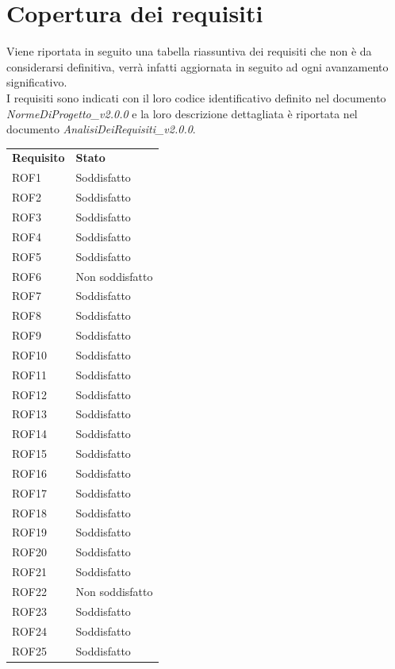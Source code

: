 \newpage
\section{Copertura dei requisiti}
Viene riportata in seguito una tabella riassuntiva dei requisiti che non è da considerarsi definitiva, verrà infatti aggiornata in seguito ad ogni avanzamento significativo. \\
I requisiti sono indicati con il loro codice identificativo definito nel documento \textit{NormeDiProgetto\_v2.0.0} e la loro descrizione dettagliata è riportata nel documento \textit{AnalisiDeiRequisiti\_v2.0.0}.
\begin{longtable}{| p{2.5cm} | p{3cm} |}
	\rowcolor{LightBlue}
	\color{white}\bfseries Requisito & \color{white}\bfseries Stato \\
	ROF1 & Soddisfatto \\ \hline
	ROF2 & Soddisfatto \\ \hline
	ROF3 & Soddisfatto \\ \hline
	ROF4 & Soddisfatto \\ \hline
	ROF5 & Soddisfatto \\ \hline
	ROF6 & Non soddisfatto \\ \hline
	ROF7 & Soddisfatto \\ \hline
	ROF8 & Soddisfatto \\ \hline
	ROF9 & Soddisfatto \\ \hline
	ROF10 & Soddisfatto \\ \hline
	ROF11 & Soddisfatto \\ \hline
	ROF12 & Soddisfatto \\ \hline
	ROF13 & Soddisfatto \\ \hline
	ROF14 & Soddisfatto \\ \hline
	ROF15 & Soddisfatto \\ \hline
	ROF16 & Soddisfatto \\ \hline
	ROF17 & Soddisfatto \\ \hline
	ROF18 & Soddisfatto \\ \hline
	ROF19 & Soddisfatto \\ \hline
	ROF20 & Soddisfatto \\ \hline
	ROF21 & Soddisfatto \\ \hline
	ROF22 & Non soddisfatto \\ \hline
	ROF23 & Soddisfatto \\ \hline
	ROF24 & Soddisfatto \\ \hline
	ROF25 & Soddisfatto \\ \hline

\end{longtable}
